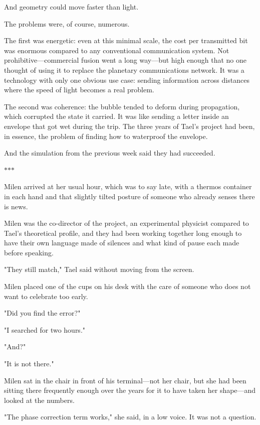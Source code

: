 \documentclass[11pt,a5paper,twoside]{book}
\begin{document}
And geometry could move faster than light.

The problems were, of course, numerous.

The first was energetic: even at this minimal scale, the cost per transmitted bit was enormous compared to any conventional communication system. Not prohibitive—commercial fusion went a long way—but high enough that no one thought of using it to replace the planetary communications network. It was a technology with only one obvious use case: sending information across distances where the speed of light becomes a real problem.

The second was coherence: the bubble tended to deform during propagation, which corrupted the state it carried. It was like sending a letter inside an envelope that got wet during the trip. The three years of Tael’s project had been, in essence, the problem of finding how to waterproof the envelope.

And the simulation from the previous week said they had succeeded.

\vspace{1.5em}
\begin{center}$\ast$\quad$\ast$\quad$\ast$\end{center}
\vspace{1.5em}

Milen arrived at her usual hour, which was to say late, with a thermos container in each hand and that slightly tilted posture of someone who already senses there is news.

Milen was the co-director of the project, an experimental physicist compared to Tael's theoretical profile, and they had been working together long enough to have their own language made of silences and what kind of pause each made before speaking.

"They still match," Tael said without moving from the screen.

Milen placed one of the cups on his desk with the care of someone who does not want to celebrate too early.

"Did you find the error?"

"I searched for two hours."

"And?"

"It is not there."

Milen sat in the chair in front of his terminal—not her chair, but she had been sitting there frequently enough over the years for it to have taken her shape—and looked at the numbers.

"The phase correction term works," she said, in a low voice. It was not a question.
\end{document}
